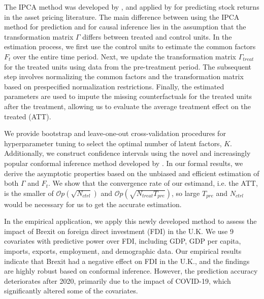 \documentclass[12pt]{article}
\begin{document}
The IPCA method was developed by \cite{kelly2020instrumented}, and applied by \cite{kelly2019characteristics} for predicting stock returns in the asset pricing literature. The main difference between using the IPCA method for prediction and for causal inference lies in the assumption that the transformation matrix $\Gamma$ differs between treated and control units. In the estimation process, we first use the control units to estimate the common factors $F_t$ over the entire time period. Next, we update the transformation matrix $\Gamma_{treat}$ for the treated units using data from the pre-treatment period. The subsequent step involves normalizing the common factors and the transformation matrix based on prespecified normalization restrictions. Finally, the estimated parameters are used to impute the missing counterfactuals for the treated units after the treatment, allowing us to evaluate the average treatment effect on the treated (ATT).

We provide bootstrap and leave-one-out cross-validation procedures for hyperparameter tuning to select the optimal number of latent factors, $K$. Additionally, we construct confidence intervals using the novel and increasingly popular conformal inference method developed by \cite{chernozhukov2021exact}. In our formal results, we derive the asymptotic properties based on the unbiased and efficient estimation of both $\Gamma$ and $F_t$. We show that the convergence rate of our estimand, i.e. the ATT, is the smaller of $\mathcal{O}p(\sqrt{N_{ctrl}})$ and $\mathcal{O}p(\sqrt{N_{treat}T_{pre}})$, so large $T_{pre}$ and $N_{ctrl}$ would be necessary for us to get the accurate estimation.


In the empirical application, we apply this newly developed method to assess the impact of Brexit on foreign direct investment (FDI) in the U.K. We use 9 covariates with predictive power over FDI, including GDP, GDP per capita, imports, exports, employment, and demographic data. Our empirical results indicate that Brexit had a negative effect on FDI in the U.K., and the findings are highly robust based on conformal inference. However, the prediction accuracy deteriorates after 2020, primarily due to the impact of COVID-19, which significantly altered some of the covariates.

\end{document}
